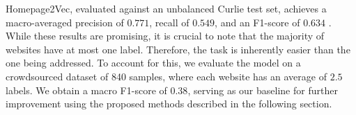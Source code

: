 Homepage2Vec, evaluated against an unbalanced Curlie test set, achieves a macro-averaged precision of $0.771$, recall of $0.549$, and an F1-score of $0.634$ \cite{homepage2vec}. While these results are promising, it is crucial to note that the majority of websites have at most one label. Therefore, the task is inherently easier than the one being addressed. To account for this, we evaluate the model on a crowdsourced dataset of 840 samples, where each website has an average of $2.5$ labels. We obtain a macro F1-score of $0.38$, serving as our baseline for further improvement using the proposed methods described in the following section.


